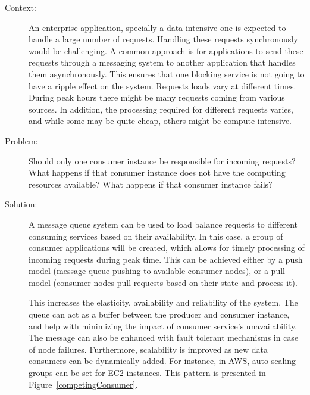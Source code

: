 \documentclass{bmcart}
\begin{document}
\begin{description}
  \item[Context:] An enterprise application, specially a data-intensive one is expected to handle a large number of requests. Handling these requests synchronously would be challenging. A common approach is for applications to send these requests through a messaging system to another application that handles them asynchronously. This ensures that one blocking service is not going to have a ripple effect on the system. Requests loads vary at different times. During peak hours there might be many requests coming from various sources. In addition, the processing required for different requests varies, and while some may be quite cheap, others might be compute intensive.
  \item[Problem:] Should only one consumer instance be responsible for incoming requests? What happens if that consumer instance does not have the computing resources available? What happens if that consumer instance fails? 
  \item[Solution:] A message queue system can be used to load balance requests to different consuming services based on their availability. In this case, a group of consumer applications will be created, which allows for timely processing of incoming requests during peak time. This can be achieved either by a push model (message queue pushing to available consumer nodes), or a pull model (consumer nodes pull requests based on their state and process it).

  This increases the elasticity, availability and reliability of the system. The queue can act as a buffer between the producer and consumer instance, and help with minimizing the impact of consumer service's unavailability. The message can also be enhanced with fault tolerant mechanisms in case of node failures. Furthermore, scalability is improved as new data consumers can be dynamically added. For instance, in AWS, auto scaling groups can be set for EC2 instances. This pattern is presented in Figure~\ref{competingConsumer}.  
\end{description}


\end{document}
